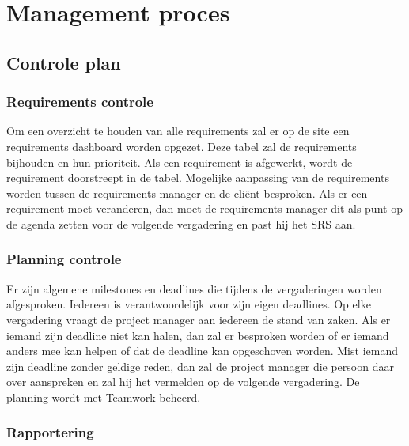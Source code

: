 \section {Management proces} 

\subsection{Controle plan}
\subsubsection{Requirements controle}
Om een overzicht te houden van alle requirements zal er op de site \cite{Website} een requirements dashboard worden opgezet. Deze tabel zal de requirements bijhouden en hun prioriteit. Als een requirement is afgewerkt, wordt de requirement doorstreept in de tabel. Mogelijke aanpassing van de requirements worden tussen de requirements manager en de cliënt besproken. Als er een requirement moet veranderen, dan moet de requirements manager dit als punt op de agenda zetten voor de volgende vergadering en past hij het SRS aan.

\subsubsection{Planning controle}

Er zijn algemene milestones en deadlines die tijdens de vergaderingen worden afgesproken. Iedereen is verantwoordelijk voor zijn eigen deadlines. Op elke vergadering vraagt de project manager aan iedereen de stand van zaken. Als er iemand zijn deadline niet kan halen, dan zal er besproken worden of er iemand anders mee kan helpen of dat de deadline kan opgeschoven worden. Mist iemand zijn deadline zonder geldige reden, dan zal de project manager die persoon daar over aanspreken en zal hij het vermelden op de volgende vergadering. De planning wordt met Teamwork \cite{Teamwork} beheerd. 

\begin{comment}
Voor de planning maken we gebruik van Teamwork \cite{Teamwork}. Het laat toe om milestones en deadlines vast te leggen voor het hele team. Bovendien is het ook mogelijk voor een enkel teamlid om zichzelf persoonlijke milestones en deadlines geven. Deze gegevens kunnen dan doorgestuurd worden met behulp van een iCal-feed naar de  agenda van dat teamlid. 
\end{comment}

\subsubsection{Rapportering} 

